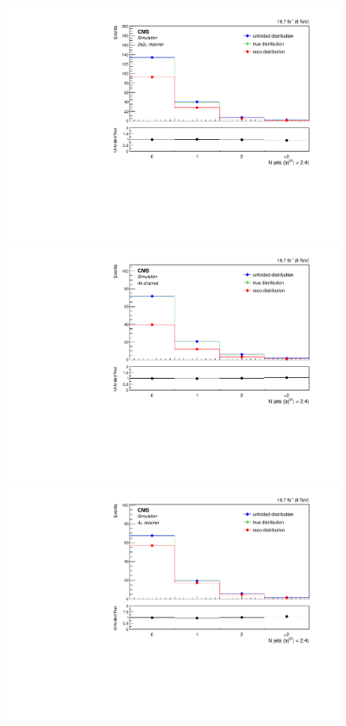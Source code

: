 \begin{figure}[hbtp]
\begin{center}
    \includegraphics[width=0.8\cmsFigWidth]{Figures/Unfolding/MCTests/CentralJets_ZZTo2e2m_MadMatrix_PowDistr_FullSample_fr}
     \includegraphics[width=0.8\cmsFigWidth]{Figures/Unfolding/MCTests/CentralJets_ZZTo4e_PowMatrix_MadDistr_FullSample_fr}     
    \includegraphics[width=0.8\cmsFigWidth]{Figures/Unfolding/MCTests/CentralJets_ZZTo4m_PowMatrix_MadDistr_FullSample_fr}     

\end{center}
\end{figure}
